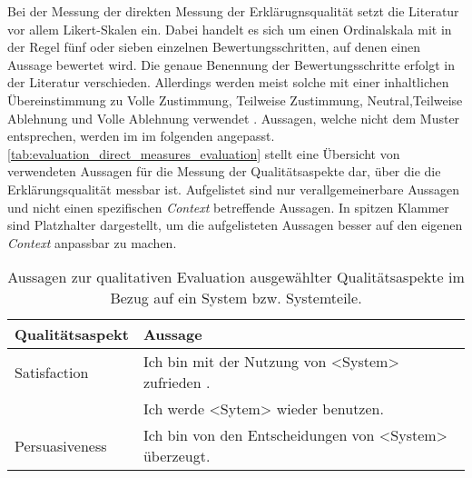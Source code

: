 Bei der Messung der direkten Messung der Erklärugnsqualität setzt die Literatur vor allem Likert-Skalen ein. Dabei handelt es sich um einen Ordinalskala mit in der Regel fünf oder sieben einzelnen Bewertungsschritten, auf denen einen Aussage bewertet wird. Die genaue Benennung der Bewertungsschritte erfolgt in der Literatur verschieden. Allerdings werden meist solche mit einer inhaltlichen Übereinstimmung zu \glqq Volle Zustimmung\grqq{}, \glqq Teilweise Zustimmung\grqq{}, \glqq Neutral\grqq{},\glqq Teilweise Ablehnung\grqq{} und \glqq Volle Ablehnung\grqq{} verwendet \cite{sato_action-triggering_2019, sato_context_nodate, wang_is_2018, hoffman_metrics_nodate, koo_understanding_2016, koo_why_2015}. Aussagen, welche nicht dem Muster entsprechen, werden im im folgenden angepasst. \autoref{tab:evaluation_direct_measures_evaluation} stellt eine Übersicht von verwendeten Aussagen für die Messung der Qualitätsaspekte dar, über die die Erklärungsqualität messbar ist. Aufgelistet sind nur verallgemeinerbare Aussagen und nicht einen spezifischen \textit{Context} betreffende Aussagen. In spitzen Klammer sind Platzhalter dargestellt, um die aufgelisteten Aussagen besser auf den eigenen \textit{Context} anpassbar zu machen.


\begin{table}[htb!]
    \begin{center}
        \begin{tabular}{|p{} p{}|}
            \hline
            \textbf{Qualitätsaspekt} & \textbf{Aussage} \\
            \hline
            \hline
            Satisfaction    & Ich bin mit der Nutzung von <System> zufrieden .
                                \cite[vgl.][]{balog_measuring_2020} \\
                            & Ich werde <Sytem> wieder benutzen.
                                \cite[vgl.][]{balog_measuring_2020} \\
            \hline
            Persuasiveness  & Ich bin von den Entscheidungen von <System> überzeugt.
                                \cite[vgl.][]{tsai_effects_2020} \\
            \hline
        \end{tabular}
    \end{center}
    \caption{Aussagen zur qualitativen Evaluation ausgewählter Qualitätsaspekte im Bezug auf ein System bzw. Systemteile.}
    \label{tab:evaluation_qualitative_system_measures}
\end{table}


